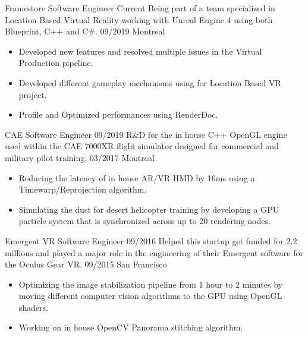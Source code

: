 %
%
%

\begin{experiences}
  \experience
    {Framestore}   			{Software Engineer}
    {Current} 			{Being part of a team specialized in Location Based Virtual Reality working with Unreal Engine 4 using both Blueprint, C++ and C\#.}
	{09/2019}	 	
	{Montreal}			{
						  \begin{itemize}
							\item Developed new features and resolved multiple issues in the Virtual Production pipeline.
							\item Developed different gameplay mechanisms using for Location Based VR project.
							\item Profile and Optimized performances using RenderDoc.
						  \end{itemize}
						 }
   \emptySeparator

  \experience
    {CAE}   				{Software Engineer}
    {09/2019} 			{R\&D for the in house C++ OpenGL engine used within the CAE 7000XR flight simulator designed for commercial and military pilot training.}
	{03/2017}	 	
	{Montreal}			{
						  \begin{itemize}
							\item Reducing the latency of in house AR/VR HMD by 16ms using a Timewarp/Reprojection algorithm.
							\item Simulating the dust for desert helicopter training by developing a GPU particle system that is synchronized across up to 20 rendering nodes.
						  \end{itemize}
						 }
   \emptySeparator
   
   \experience
    {Emergent VR} 			{Software Engineer}
    {09/2016} 				{Helped this startup get funded for 2.2 millions and played a major role in the engineering of their Emergent software for the Oculus Gear VR.}
	{09/2015}	 	
	{San Francisco}			{
						  \begin{itemize}
							\item Optimizing the image stabilization pipeline from 1 hour to 2 minutes by moving different computer vision algorithms to the GPU using OpenGL shaders.
							\item Working on in house OpenCV Panorama stitching algorithm.
						  \end{itemize}
						 }
   \emptySeparator
   

\end{experiences}
